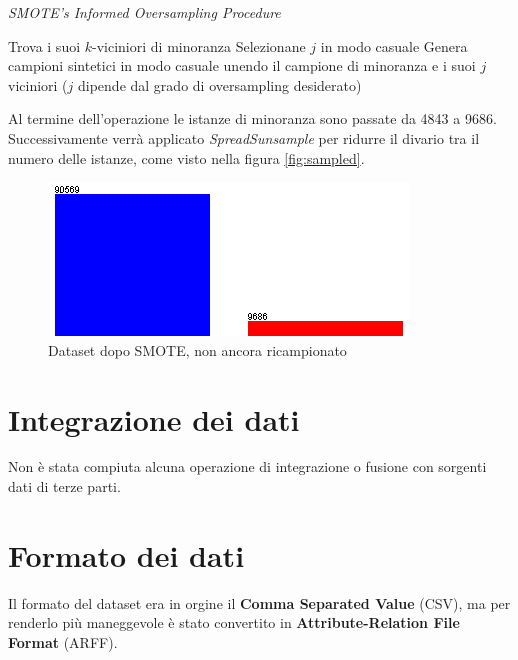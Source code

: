 \begin{algorithm}[!htb]
	\caption{\emph{SMOTE’s Informed Oversampling Procedure}}
	\begin{algorithmic}[1]
				\State Trova i suoi $k$-viciniori di minoranza
				\State Selezionane $j$ in modo casuale
				\State Genera campioni sintetici in modo casuale unendo il campione di minoranza e i suoi $j$ viciniori ($j$ dipende dal grado di oversampling desiderato)
		\EndFor
	\end{algorithmic}
\end{algorithm}


Al termine dell'operazione le istanze di minoranza sono passate da 4843 a 9686. Successivamente verrà applicato \textit{SpreadSunsample} per ridurre il divario tra il numero delle istanze, come visto nella figura \ref{fig:sampled}.

\begin{figure}[!htb]
	\centering
	\includegraphics[width=.6\linewidth]{./images/smoted}
	\caption{Dataset dopo SMOTE, non ancora ricampionato}
\end{figure}


\section{Integrazione dei dati}
Non è stata compiuta alcuna operazione di integrazione o fusione con sorgenti dati di terze parti.

\section{Formato dei dati}
Il formato del dataset era in orgine il \textbf{Comma Separated Value} (CSV), ma per renderlo più maneggevole è stato convertito in \textbf{Attribute-Relation File Format} (ARFF).
